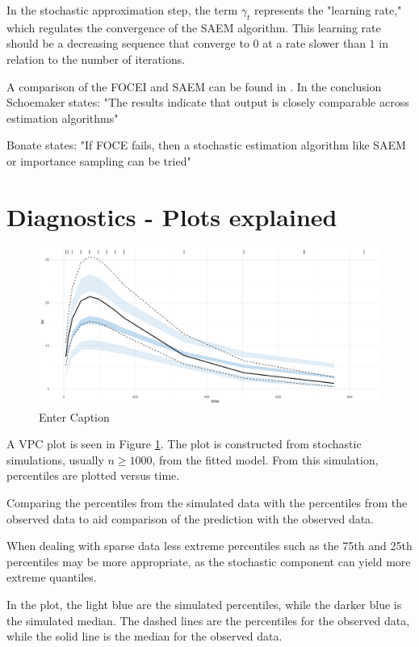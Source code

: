 In the stochastic approximation step, the term $\gamma_t$ represents the "learning rate," which regulates the convergence of the SAEM algorithm. This learning rate should be a decreasing sequence that converge to $0$ at a rate slower than $1$ in relation to the number of iterations. \citep{Comets2017}



A comparison of the FOCEI and SAEM can be found in \citep{Schoemaker2019}. In the conclusion Schoemaker states: "The results indicate that output is closely comparable
across estimation algorithms"

Bonate states: "If FOCE
fails, then a stochastic estimation algorithm like SAEM or
importance sampling can be tried" \citep[p.304]{bonate}


\section{Diagnostics - Plots explained}
\begin{figure}
    \centering
    \includegraphics[width=0.9\linewidth]{fig/img/Xpose/vpcPlot.pdf}
    \caption{Enter Caption}
    \label{Fig: VPC}
\end{figure}
A VPC plot is seen in Figure \ref{Fig: VPC}. The plot is constructed from stochastic simulations, usually $n \geq 1000$, from the fitted model. From this simulation, percentiles are plotted versus time. 

Comparing the percentiles from the simulated data with the percentiles from the observed data to aid comparison of the prediction with the observed data. 

When dealing with sparse data less extreme percentiles such as the 75th and 25th percentiles may be more appropriate, as the stochastic component can yield more extreme quantiles. 

In the plot, the light blue are the simulated percentiles, while the darker blue is the simulated median. The dashed lines are the percentiles for the observed data, while the solid line is the median for the observed data. 

